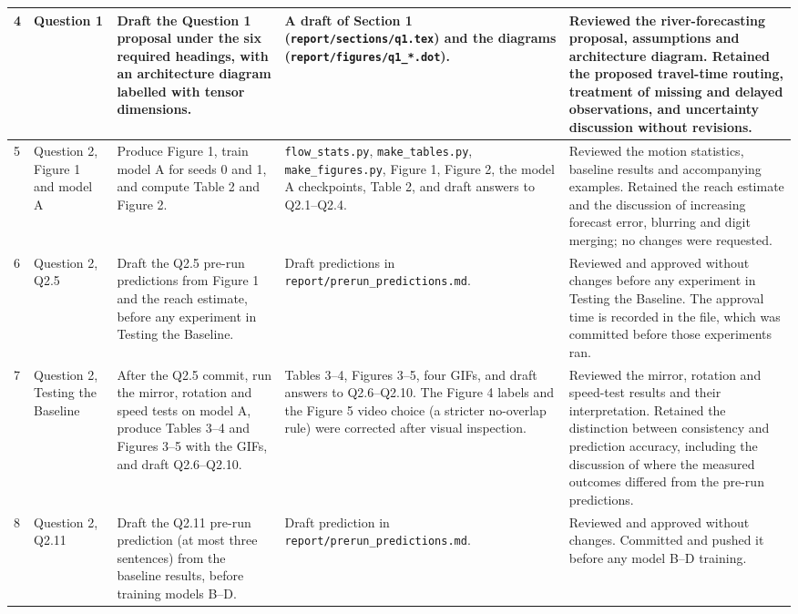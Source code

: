 {\begin{longtable}{p{}p{}p{}p{}p{}}
4 & Question 1 & Draft the Question 1 proposal under the six required headings, with an architecture diagram labelled with tensor dimensions. & A draft of Section 1 (\texttt{report/sections/q1.tex}) and the diagrams (\texttt{report/figures/q1\_*.dot}). & Reviewed the river-forecasting proposal, assumptions and architecture diagram. Retained the proposed travel-time routing, treatment of missing and delayed observations, and uncertainty discussion without revisions. \\ \midrule
5 & Question 2, Figure 1 and model A & Produce Figure 1, train model A for seeds 0 and 1, and compute Table 2 and Figure 2. & \texttt{flow\_stats.py}, \texttt{make\_tables.py}, \texttt{make\_figures.py}, Figure 1, Figure 2, the model A checkpoints, Table 2, and draft answers to Q2.1--Q2.4. & Reviewed the motion statistics, baseline results and accompanying examples. Retained the reach estimate and the discussion of increasing forecast error, blurring and digit merging; no changes were requested. \\ \midrule
6 & Question 2, Q2.5 & Draft the Q2.5 pre-run predictions from Figure 1 and the reach estimate, before any experiment in Testing the Baseline. & Draft predictions in \texttt{report/prerun\_predictions.md}. & Reviewed and approved without changes before any experiment in Testing the Baseline. The approval time is recorded in the file, which was committed before those experiments ran. \\ \midrule
7 & Question 2, Testing the Baseline & After the Q2.5 commit, run the mirror, rotation and speed tests on model A, produce Tables 3--4 and Figures 3--5 with the GIFs, and draft Q2.6--Q2.10. & Tables 3--4, Figures 3--5, four GIFs, and draft answers to Q2.6--Q2.10. The Figure 4 labels and the Figure 5 video choice (a stricter no-overlap rule) were corrected after visual inspection. & Reviewed the mirror, rotation and speed-test results and their interpretation. Retained the distinction between consistency and prediction accuracy, including the discussion of where the measured outcomes differed from the pre-run predictions. \\ \midrule
8 & Question 2, Q2.11 & Draft the Q2.11 pre-run prediction (at most three sentences) from the baseline results, before training models B--D. & Draft prediction in \texttt{report/prerun\_predictions.md}. & Reviewed and approved without changes. Committed and pushed it before any model B--D training. \\ \midrule

\end{longtable}}
